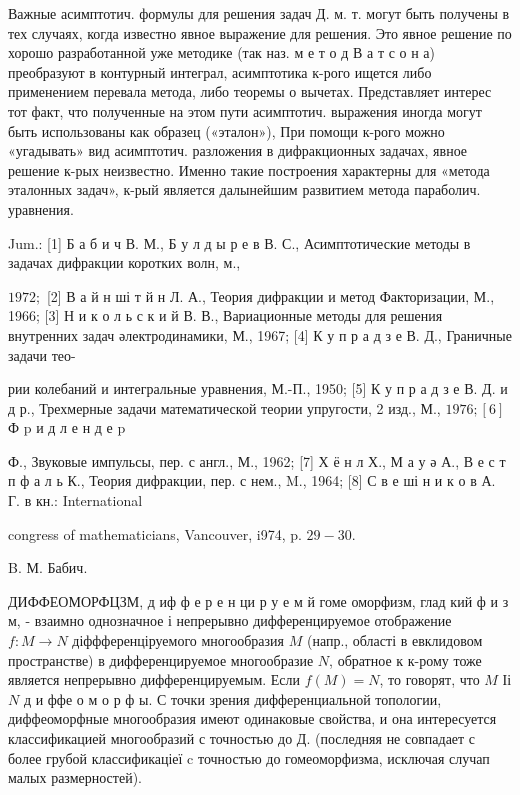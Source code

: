 \documentclass[10pt]{article}
\begin{document}
Важные асимптотич. формулы для решения задач Д. м. т. могут быть получены в тех случаях, когда известно явное выражение для решения. Это явное решение по хорошо разработанной уже методике (так наз. м е т о д В а т с о н а) преобразуют в контурный интеграл, асимптотика к-рого ищется либо применением перевала метода, либо теоремы о вычетах. Представляет интерес тот факт, что полученные на этом пути асимптотич. выражения иногда могут быть использованы как образец («эталон»), При помощи к-рого можно «угадывать» вид асимптотич. разложения в дифракционных задачах, явное решение к-рых неизвестно. Именно такие построения характерны для «метода эталонных задач», к-рый является далынейшим развитием метода параболич. уравнения.



Jum.: [1] Б а б и ч В. М., Б у л д ы р е в В. С., Асимптотические методы в задачах дифракции коротких волн, м.,

$1972 ;$ [2] В а й н ші т й н Л. А., Теория дифракции и метод Факторизации, М., 1966; [3] Н и к о л ь с к и й В. В., Вариационные методы для решения внутренних задач әлектродинамики, М., 1967; [4] К у п р а д з е В. Д., Граничные задачи тео-

рии колебаний и интегральные уравнения, М.-П., 1950; [5] К у п р а д з е В. Д. и д р., Трехмерные задачи математической теории упругости, 2 изд., М., $1976 ;[6]$ Ф p и д л е н д е p

Ф., Звуковые импульсы, пер. с англ., М., 1962; [7] Х ё н л Х., М а у ә А., В е с т п ф а л ь К., Теория дифракции, пер. с нем., M., 1964; [8] С в е ші н и к о в А. Г. в кн.: International

congress of mathematicians, Vancouver, i974, p. $29-30$.

B. М. Бабич.



ДИФФЕОМОРФЦЗМ, д иф ф е р е н ци р у е м й гоме оморфизм, глад кий ф и з м, - взаимно однозначное і непрерывно дифференцируемое отображение $f: M \rightarrow N$ діффференціруемого многообразия $M$ (напр., області в евклидовом пространстве) в дифференцируемое многообразие $N$, обратное к к-рому тоже является непрерывно дифференцируемым. Если $f(M)=N$, то говорят, что $M$ Іі $N$ д и ффе о м о р ф ы. С точки зрения дифференциальной топологии, диффеоморфные многообразия имеют одинаковые свойства, и она интересуется классификацией многообразий с точностью до Д. (последняя не совпадает с более грубой классификаціеї c точностью до гомеоморфизма, исключая случап малых размерностей).
\end{document}
